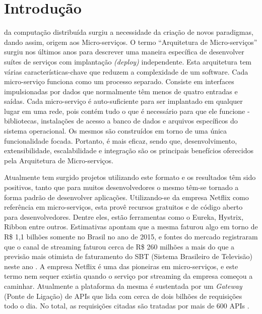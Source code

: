 \documentclass[journal]{IEEEtran}
\begin{document}
\section{Introdução}
% 
% 
% 
% 
 da computação distribuída surgiu a necessidade da criação de novos paradigmas, dando assim, origem aos Micro-serviços. O termo “Arquitetura de Micro-serviços” surgiu nos últimos anos para descrever uma maneira específica de desenvolver suítes de serviços com implantação \emph{(deploy)} independente. Esta arquitetura tem várias características-chave que reduzem a complexidade de um software. Cada micro-serviço funciona como um processo separado. Consiste em interfaces impulsionadas por dados que normalmente têm menos de quatro entradas e saídas. Cada micro-serviço é auto-suficiente para ser implantado em qualquer lugar em uma rede, pois contém tudo o que é necessário para que ele funcione - bibliotecas, instalações de acesso a banco de dados e arquivos específicos do sistema operacional. Os mesmos são construídos em torno de uma única funcionalidade focada. Portanto, é mais eficaz, sendo que, desenvolvimento, extensibilidade, escalabilidade e integração são os principais benefícios oferecidos pela Arquitetura de Micro-serviços. 

Atualmente tem surgido projetos utilizando este formato e os resultados têm sido positivos, tanto que para muitos desenvolvedores o mesmo têm-se tornado a forma padrão de desenvolver aplicações. Utilizando-se da empresa Netflix como referência em micro-serviços, esta provê recursos gratuitos e de código aberto para desenvolvedores. Dentre eles, estão ferramentas como o Eureka, Hystrix, Ribbon entre outros. Estimativas apontam que a mesma faturou algo em torno de R\$ 1,1 bilhões somente no Brasil no ano de 2015, e fontes do mercado registraram que o canal de streaming faturou cerca de R\$ 260 milhões a mais do que a previsão mais otimista de faturamento do SBT (Sistema Brasileiro de Televisão) neste ano \cite{RicardoFeltrin}. A empresa Netflix é uma das pioneiras em micro-serviços, e este termo nem sequer existia quando o serviço por streaming da empresa começou a caminhar. Atualmente a plataforma da mesma é sustentada por um \emph{Gateway} (Ponte de Ligação) de APIs que lida com cerca de dois bilhões de requisições todo o dia. No total, as requisições citadas são tratadas por mais de 600 APIs \cite{SmartBear}. 
\end{document}
